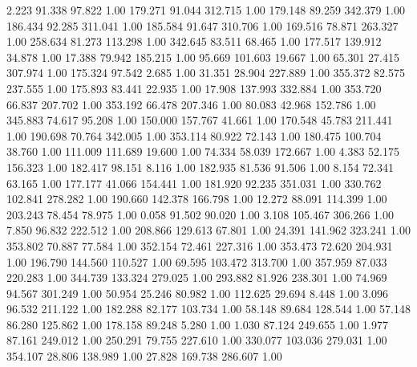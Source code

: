    2.223   91.338   97.822         1.00
 179.271   91.044  312.715         1.00
 179.148   89.259  342.379         1.00
 186.434   92.285  311.041         1.00
 185.584   91.647  310.706         1.00
 169.516   78.871  263.327         1.00
 258.634   81.273  113.298         1.00
 342.645   83.511   68.465         1.00
 177.517  139.912   34.878         1.00
  17.388   79.942  185.215         1.00
  95.669  101.603   19.667         1.00
  65.301   27.415  307.974         1.00
 175.324   97.542    2.685         1.00
  31.351   28.904  227.889         1.00
 355.372   82.575  237.555         1.00
 175.893   83.441   22.935         1.00
  17.908  137.993  332.884         1.00
 353.720   66.837  207.702         1.00
 353.192   66.478  207.346         1.00
  80.083   42.968  152.786         1.00
 345.883   74.617   95.208         1.00
 150.000  157.767   41.661         1.00
 170.548   45.783  211.441         1.00
 190.698   70.764  342.005         1.00
 353.114   80.922   72.143         1.00
 180.475  100.704   38.760         1.00
 111.009  111.689   19.600         1.00
  74.334   58.039  172.667         1.00
   4.383   52.175  156.323         1.00
 182.417   98.151    8.116         1.00
 182.935   81.536   91.506         1.00
   8.154   72.341   63.165         1.00
 177.177   41.066  154.441         1.00
 181.920   92.235  351.031         1.00
 330.762  102.841  278.282         1.00
 190.660  142.378  166.798         1.00
  12.272   88.091  114.399         1.00
 203.243   78.454   78.975         1.00
   0.058   91.502   90.020         1.00
   3.108  105.467  306.266         1.00
   7.850   96.832  222.512         1.00
 208.866  129.613   67.801         1.00
  24.391  141.962  323.241         1.00
 353.802   70.887   77.584         1.00
 352.154   72.461  227.316         1.00
 353.473   72.620  204.931         1.00
 196.790  144.560  110.527         1.00
  69.595  103.472  313.700         1.00
 357.959   87.033  220.283         1.00
 344.739  133.324  279.025         1.00
 293.882   81.926  238.301         1.00
  74.969   94.567  301.249         1.00
  50.954   25.246   80.982         1.00
 112.625   29.694    8.448         1.00
   3.096   96.532  211.122         1.00
 182.288   82.177  103.734         1.00
  58.148   89.684  128.544         1.00
  57.148   86.280  125.862         1.00
 178.158   89.248    5.280         1.00
   1.030   87.124  249.655         1.00
   1.977   87.161  249.012         1.00
 250.291   79.755  227.610         1.00
 330.077  103.036  279.031         1.00
 354.107   28.806  138.989         1.00
  27.828  169.738  286.607         1.00
